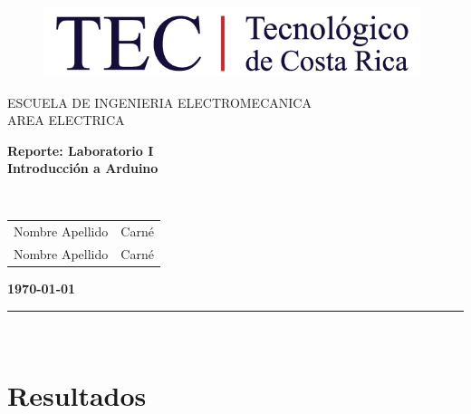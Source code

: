 \documentclass[12pt,letterpaper]{report}
\begin{document}
\begin{titlepage}

\begin{center}
\vspace*{-0.5in}
\begin{figure}[htb]
\begin{center}
\includegraphics[width=11cm]{fig/logo.png}
\end{center}
\end{figure}
\vspace*{0.4in}
\begin{Large}
ESCUELA DE INGENIERIA ELECTROMECANICA\\
\vspace*{0.15in}
AREA ELECTRICA\\
\vspace*{0.8in}
\end{Large}
\vspace*{0.2in}
\begin{Large}
\textbf{Reporte: Laboratorio I} \\
\vspace*{0.1in}
\textbf{Introducción a Arduino}
\end{Large}
\vspace*{0.3in}\\
\begin{center}
    \begin{tabular}{c|c}
        Nombre Apellido & Carné  \\
        Nombre Apellido & Carné
    \end{tabular}
\end{center}
\vspace*{2.5in}
\begin{Large}
\textbf{\today}\\
\end{Large}
\rule{80mm}{0.1mm}\\
\vspace*{0.1in}
\end{center}

\end{titlepage}

\tableofcontents



\section{Resultados}
\end{document}
